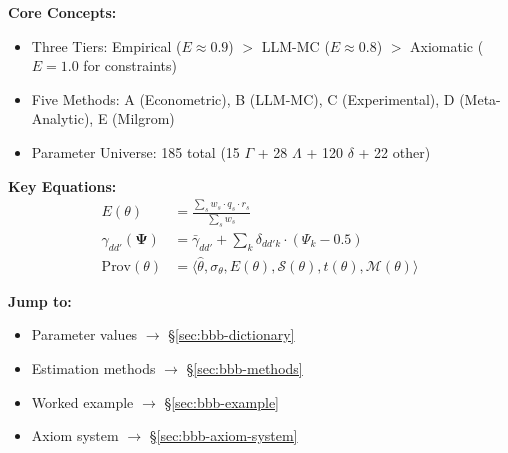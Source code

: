 \documentclass[11pt,a4paper]{article}
\theoremstyle{definition}
\begin{document}
\begin{tcolorbox}[colback=green!5!white, colframe=green!75!black, 
    title=\textbf{Quick Reference}]

\textbf{Core Concepts:}
\begin{itemize}[nosep]
    \item Three Tiers: Empirical ($E \approx 0.9$) $>$ LLM-MC ($E \approx 0.8$) $>$ Axiomatic ($E = 1.0$ for constraints)
    \item Five Methods: A (Econometric), B (LLM-MC), C (Experimental), D (Meta-Analytic), E (Milgrom)
    \item Parameter Universe: 185 total (15 $\Gamma$ + 28 $\Lambda$ + 120 $\delta$ + 22 other)
\end{itemize}

\textbf{Key Equations:}
\begin{align}
E(\theta) &= \frac{\sum_{s} w_s \cdot q_s \cdot r_s}{\sum_{s} w_s} \tag{Epistemic Status} \\
\gamma_{dd'}(\boldsymbol{\Psi}) &= \bar{\gamma}_{dd'} + \sum_{k} \delta_{dd'k} \cdot (\Psi_k - 0.5) \tag{Context Modulation} \\
\text{Prov}(\theta) &= \langle \hat{\theta}, \sigma_\theta, E(\theta), \mathcal{S}(\theta), t(\theta), \mathcal{M}(\theta) \rangle \tag{Provenance Tuple}
\end{align}

\textbf{Jump to:}
\begin{itemize}[nosep]
    \item Parameter values $\rightarrow$ \S\ref{sec:bbb-dictionary}
    \item Estimation methods $\rightarrow$ \S\ref{sec:bbb-methods}
    \item Worked example $\rightarrow$ \S\ref{sec:bbb-example}
    \item Axiom system $\rightarrow$ \S\ref{sec:bbb-axiom-system}
\end{itemize}

\end{tcolorbox}




\end{document}
